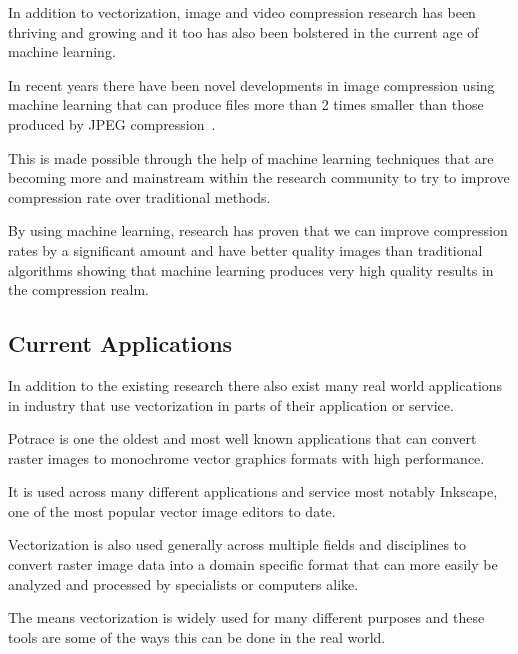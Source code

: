 \documentclass[12pt]{article}
\newcommand{\sentence}{} %
\begin{document}
    \bigskip
    In addition to vectorization, image and video compression research has been thriving and growing and it
    too has also been bolstered in the current age of machine learning.
    \sentence
    In recent years there have been novel developments in image compression using machine learning that can produce
    files more than 2 times smaller than those produced by JPEG compression~\cite{rippel2017}.
    \sentence
    This is made possible through the help of machine learning techniques that are becoming more and mainstream
    within the research community to try to improve compression rate over traditional methods.
    \sentence
    By using machine learning, research has proven that we can improve compression rates by a significant amount and
    have better quality images than traditional algorithms showing that machine learning produces very high quality
    results in the compression realm.

    \subsection{Current Applications}\label{subsec:current-applications}

    \tab
    In addition to the existing research there also exist many real world applications in industry that
    use vectorization in parts of their application or service.
    \sentence
    Potrace is one the oldest and most well known applications that can convert raster images to monochrome vector
    graphics formats with high performance.
    \sentence
    It is used across many different applications and service most notably Inkscape, one of the most popular vector
    image editors to date.
    \sentence
    Vectorization is also used generally across multiple fields and disciplines to convert raster image data into a
    domain specific format that can more easily be analyzed and processed by specialists or computers alike.
    \sentence
    The means vectorization is widely used for many different purposes and these tools are some of the ways this can
    be done in the real world.
\end{document}
